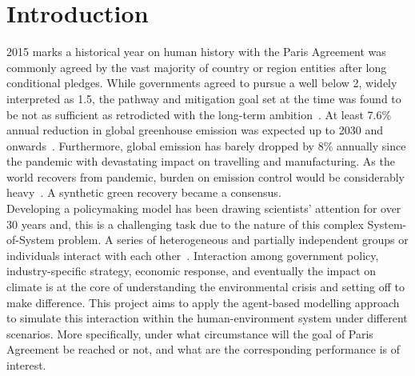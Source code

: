 \documentclass[12pt,twoside]{report}
\date{June 2021}
\begin{document}
	


	\clearpage{\pagestyle{empty}\cleardoublepage}
	\setcounter{page}{1}
	\pagestyle{fancy}

%
	
	
	

	\tableofcontents
	\clearpage%
	\setcounter{page}{1}
	\fancyhead[LE,RO]{\slshape \rightmark}
	\fancyhead[LO,RE]{\slshape \leftmark}

	
	
	\chapter{Introduction}\label{ch:introduction}
	2015 marks a historical year on human history with the Paris Agreement was commonly agreed by the vast majority
	of country or region entities after long conditional pledges.
	While governments agreed to pursue a well below 2\textcelsius, widely interpreted as 1.5\textcelsius, the
	pathway and mitigation goal set at the time was found to be not as sufficient as retrodicted with the long-term
	ambition~\cite{Schleussner2016}.
	At least 7.6\% annual reduction in global greenhouse emission was expected up to 2030 and
	onwards~\cite{UNEP2019, Eric2020}.
	Furthermore, global emission has barely dropped by 8\% annually since the pandemic with devastating impact on
	travelling and manufacturing.
	As the world recovers from pandemic, burden on emission control would be considerably heavy~\cite{Eric2020,
		dafnomilis2020}.
	A synthetic green recovery became a consensus.\\
	
	Developing a policymaking model has been drawing scientists' attention for over 30 years and, this is a
	challenging task due to the nature of this complex System-of-System problem.
	A series of heterogeneous and partially independent groups or individuals interact with each
	other~\cite{GERST201362}.
	Interaction among government policy, industry-specific strategy, economic response, and eventually the impact on
	climate is at the core of understanding the environmental crisis and setting off to make difference.
	This project aims to apply the agent-based modelling approach to simulate this interaction within the
	human-environment system under different scenarios.
	More specifically, under what circumstance will the goal of Paris Agreement be reached or not, and what are the
	corresponding performance is of interest.
\end{document}
